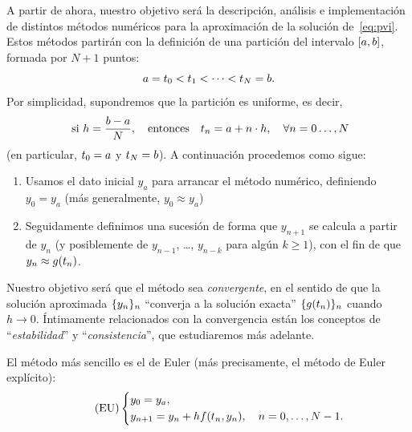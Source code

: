 A partir de ahora, nuestro objetivo será la descripción, análisis e
implementación de distintos métodos numéricos para la aproximación de
la solución de~\eqref{eq:pvi}. Estos métodos partirán con la
definición de una partición del intervalo $[\ta,\tb]$, formada por
$N+1$ puntos:
\begin{equation*}
  \ta=\tt_0 < \tt_1 < \cdots < \tt_N=\tb.
\end{equation*}
Por simplicidad, supondremos que la partición es uniforme, es decir,
\begin{equation*}
  \text{ si } h=\frac{b-a}{N}, \quad \text{entonces} \quad
  \tt_n=\ta+n\cdot h,\quad \forall n=0\dots,N
\end{equation*}
(en particular, $\tt_0=a$ y $\tt_N=b$). A continuación procedemos como
sigue:
\begin{enumerate}
\item Usamos el dato inicial $y_a$ para arrancar el método numérico,
  definiendo $y_0=y_a$ (más generalmente, $y_0\approx y_a$)
\item Seguidamente definimos una sucesión de forma que $y_{n+1}$ se
  calcula a partir de $y_n$ (y posiblemente de $y_{n-1}$, \dots,
  $y_{n-k}$ para algún $k\ge 1$), con el fin de que
  $y_n\approx\sol(\tn)$.
\end{enumerate}
Nuestro objetivo será que el método sea \textit{convergente}, en el
sentido de que la solución aproximada $\{\yn\}_n$ ``converja a la
solución exacta'' $\{\sol(\tn)\}_n$ cuando $h\to 0$. Íntimamente
relacionados con la convergencia están los conceptos de
``\textit{estabilidad}'' y ``\textit{consistencia}'', que estudiaremos
más adelante.

El método más sencillo es el de Euler (más precisamente, el método
de Euler explícito):
\begin{equation}
  \tag{EU}
  \label{eq:metodo-euler}
  \left\{
    \begin{aligned}
      &y_0 = \ycero, \\
      &y_{n+1} = \yn + h f(\tn, \yn), \quad n=0,\dots,N-1.
    \end{aligned}
  \right.
\end{equation}


